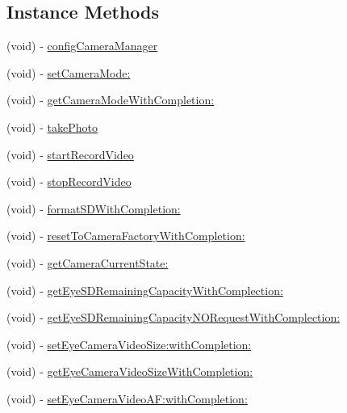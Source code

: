 \subsection*{Instance Methods}
\begin{DoxyCompactItemize}
\item 
(void) -\/ \hyperlink{interface_p_v_camera_ab403893e625b5678307d260e0e7d70b8}{config\+Camera\+Manager}
\item 
(void) -\/ \hyperlink{interface_p_v_camera_a925740abed7327808fa2f04a8198f0e2}{set\+Camera\+Mode\+:}
\item 
(void) -\/ \hyperlink{interface_p_v_camera_ac25342f6acc76602836f7e3326a3d1d3}{get\+Camera\+Mode\+With\+Completion\+:}
\item 
(void) -\/ \hyperlink{interface_p_v_camera_ab2d9992ae6facf16efa63a7effa2e461}{take\+Photo}
\item 
(void) -\/ \hyperlink{interface_p_v_camera_ae61a3cfbad1930093b1284f18425ffc0}{start\+Record\+Video}
\item 
(void) -\/ \hyperlink{interface_p_v_camera_a36365b2f0c0896ed0552244fccdb9ebe}{stop\+Record\+Video}
\item 
(void) -\/ \hyperlink{interface_p_v_camera_a37f0f3fcf852fe18e059717085ff29aa}{format\+S\+D\+With\+Completion\+:}
\item 
(void) -\/ \hyperlink{interface_p_v_camera_a18a94868a2e12ac35d6afee0f2b0a35b}{reset\+To\+Camera\+Factory\+With\+Completion\+:}
\item 
(void) -\/ \hyperlink{interface_p_v_camera_a6a7279d4abe72a35eb712c59d2c786ef}{get\+Camera\+Current\+State\+:}
\item 
(void) -\/ \hyperlink{interface_p_v_camera_a5f07a09355fa80150a148b2e233a9f42}{get\+Eye\+S\+D\+Remaining\+Capacity\+With\+Complection\+:}
\item 
(void) -\/ \hyperlink{interface_p_v_camera_ad5f62d0984dd1278d2364135afc7bb6d}{get\+Eye\+S\+D\+Remaining\+Capacity\+N\+O\+Request\+With\+Complection\+:}
\item 
(void) -\/ \hyperlink{interface_p_v_camera_a0e79c751fd196206a1fc3735cb91dacb}{set\+Eye\+Camera\+Video\+Size\+:with\+Completion\+:}
\item 
(void) -\/ \hyperlink{interface_p_v_camera_a38ce88a0cb230800a798f84157d079c6}{get\+Eye\+Camera\+Video\+Size\+With\+Completion\+:}
\item 
(void) -\/ \hyperlink{interface_p_v_camera_ad967efa7d2d065bb1a5674a8ce139f7b}{set\+Eye\+Camera\+Video\+A\+F\+:with\+Completion\+:}
\item 

\end{DoxyCompactItemize}
